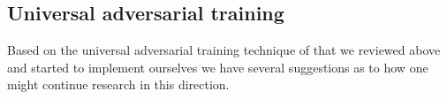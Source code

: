 \subsection{Universal adversarial training}

Based on the universal adversarial training technique of \cite{shafahi_universal_2018} that we reviewed above and started to implement ourselves we have several suggestions as to how one might continue research in this direction. 








